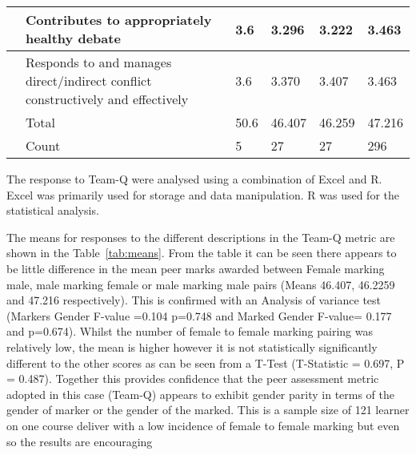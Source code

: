 \documentclass[sigconf, anonymous=true]{acmart}
\begin{document}
\begin{table*}[ht]
\begin{tabular} {| p{3cm} | p{8cm} | p{1cm}| p{1cm} | p{1cm}| p{1cm} |}
\hline
                                    & Contributes to appropriately healthy debate                                                      & 3.6                                                     & 3.296                                                 & 3.222                                                 & 3.463                                               \\
                                    
\hline
                                    & Responds to and manages direct/indirect conflict constructively and effectively                  & 3.6                                                     & 3.370                                                 & 3.407                                                 & 3.463                                               \\
\hline
& Total                                                                                                              & 50.6                                                    & 46.407                                                & 46.259                                                & 47.216                                              \\
\hline
& Count                                                                                                              & 5                                                       & 27                                                    & 27                                                    & 296
\\
\hline
\end{tabular}
\label{tab:means}
\end{table*}
The response to Team-Q were analysed using a combination of Excel and R. Excel was primarily used for storage and data manipulation. R was used for the statistical analysis. 

The means for responses to the different descriptions in the Team-Q metric are shown in the Table~\ref{tab:means}. From the table it can be seen there appears to be little difference in the mean peer marks awarded between Female marking male, male marking female or male marking male pairs (Means 46.407, 46.2259 and 47.216 respectively). This is confirmed with an Analysis of variance test (Markers Gender F-value =0.104 p=0.748 and Marked Gender F-value= 0.177 and p=0.674). Whilst the number of female to female marking pairing was relatively low, the mean is higher however it is not statistically significantly different to the other scores as can be seen from a T-Test (T-Statistic = 0.697, P = 0.487). Together this provides confidence that the peer assessment metric adopted in this case (Team-Q) appears to exhibit gender parity in terms of the gender of marker or the gender of the marked. This is a sample size of 121 learner on one course deliver with a low incidence of female to female marking but even so the results are encouraging
\end{document}
